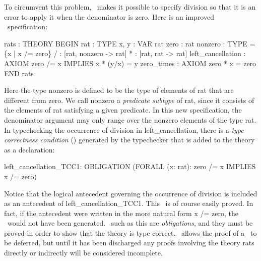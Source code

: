 To circumvent this problem, \pvs\ makes it possible to specify division
so that it is an error to apply it when the denominator is zero.  Here
is an improved \pvs\ specification:
\begin{pvsexample}
  rats : THEORY
   BEGIN
    rat : TYPE
    x, y : VAR rat
    zero : rat
    nonzero : TYPE = \{x | x /= zero\}
    / : [rat, nonzero -> rat]
    * : [rat, rat -> rat]
    left_cancellation : AXIOM zero /= x IMPLIES x * (y/x)  = y
    zero_times : AXIOM zero * x = zero
   END rats
\end{pvsexample}
%
Here the type {\stt nonzero} is defined to be the type of elements of
{\stt rat} that are different from {\stt zero}.  We call {\stt nonzero} a
{\em predicate subtype} of {\stt rat}, since it consists of the elements
of {\stt rat} satisfying a given predicate.  In this new specification,
the denominator argument may only range over the nonzero elements of the
type {\stt rat}.  In typechecking the occurrence of division in {\stt
left\_cancellation}, there is a {\em type correctness condition\/} (\tcc)
generated by the typechecker that is added to the theory as a
declaration:
\begin{pvsexample}
left_cancellation_TCC1: OBLIGATION
      (FORALL (x: rat): zero /= x IMPLIES x /= zero)
\end{pvsexample}
%
Notice that the logical antecedent governing the occurrence of division
is included as an antecedent of {\stt left\_cancellation\_TCC1}.  This
\tcc\ is of course easily proved.  In fact, if the antecedent were
written in the more natural form {\stt x /= zero}, the \tcc\ would not
have been generated.  \tccs\ such as this are {\em obligations\/}, and
they must be proved in order to show that the theory is type correct.
\pvs\ allows the proof of a \tcc\ to be deferred, but until it has been
discharged any proofs involving the theory {\stt rats} directly or
indirectly will be considered incomplete.

